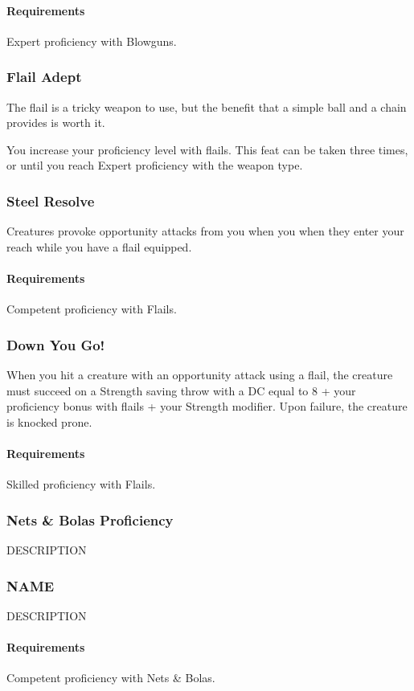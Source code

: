     \paragraph{Requirements} Expert proficiency with Blowguns.
\subsubsection{Flail Adept} \label{feat::flailadept}
    The flail is a tricky weapon to use, but the benefit that a simple ball and a chain provides is worth it.

    You increase your proficiency level with flails.
    This feat can be taken three times, or until you reach Expert proficiency with the weapon type.
\subsubsection{Steel Resolve} \label{feat::steelresolve}
    Creatures provoke opportunity attacks from you when you when they enter your reach while you have a flail equipped.
    \paragraph{Requirements} Competent proficiency with Flails.
\subsubsection{Down You Go!} \label{feat::downyougo}
    When you hit a creature with an opportunity attack using a flail, the creature must succeed on a Strength saving throw with a DC equal to 8 + your proficiency bonus with flails + your Strength modifier.
    Upon failure, the creature is knocked prone.
    \paragraph{Requirements} Skilled proficiency with Flails.
\subsubsection{Nets \& Bolas Proficiency} \label{feat::name}
    DESCRIPTION
\subsubsection{NAME} \label{feat::name}
    DESCRIPTION
    \paragraph{Requirements} Competent proficiency with Nets \& Bolas.
